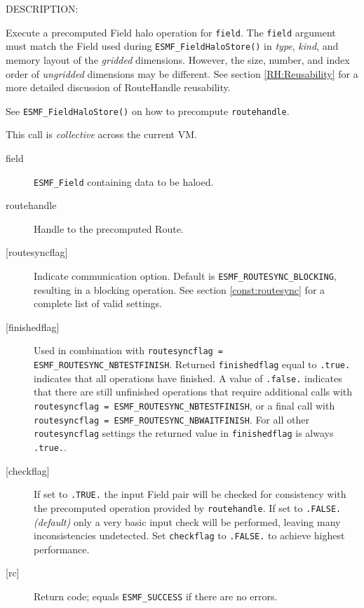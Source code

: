 {\sf DESCRIPTION:\\ }


     Execute a precomputed Field halo operation for {\tt field}. 
     The {\tt field} argument must match the Field used during 
     {\tt ESMF\_FieldHaloStore()} in {\em type}, {\em kind}, and 
     memory layout of the {\em gridded} dimensions. However, the size, number, 
     and index order of {\em ungridded} dimensions may be different. See section
     \ref{RH:Reusability} for a more detailed discussion of RouteHandle 
     reusability.
  
     See {\tt ESMF\_FieldHaloStore()} on how to precompute {\tt routehandle}.
  
     This call is {\em collective} across the current VM.
  
     \begin{description}
     \item [field]
       {\tt ESMF\_Field} containing data to be haloed.
     \item [routehandle]
       Handle to the precomputed Route.
     \item [{[routesyncflag]}]
       Indicate communication option. Default is {\tt ESMF\_ROUTESYNC\_BLOCKING},
       resulting in a blocking operation.
       See section \ref{const:routesync} for a complete list of valid settings.
     \item [{[finishedflag]}]
       \begin{sloppypar}
       Used in combination with {\tt routesyncflag = ESMF\_ROUTESYNC\_NBTESTFINISH}.
       Returned {\tt finishedflag} equal to {\tt .true.} indicates that all
       operations have finished. A value of {\tt .false.} indicates that there
       are still unfinished operations that require additional calls with
       {\tt routesyncflag = ESMF\_ROUTESYNC\_NBTESTFINISH}, or a final call with
       {\tt routesyncflag = ESMF\_ROUTESYNC\_NBWAITFINISH}. For all other {\tt routesyncflag}
       settings the returned value in {\tt finishedflag} is always {\tt .true.}.
       \end{sloppypar}
     \item [{[checkflag]}]
       If set to {\tt .TRUE.} the input Field pair will be checked for
       consistency with the precomputed operation provided by {\tt routehandle}.
       If set to {\tt .FALSE.} {\em (default)} only a very basic input check
       will be performed, leaving many inconsistencies undetected. Set
       {\tt checkflag} to {\tt .FALSE.} to achieve highest performance.
     \item [{[rc]}]
       Return code; equals {\tt ESMF\_SUCCESS} if there are no errors.
     \end{description}
   
